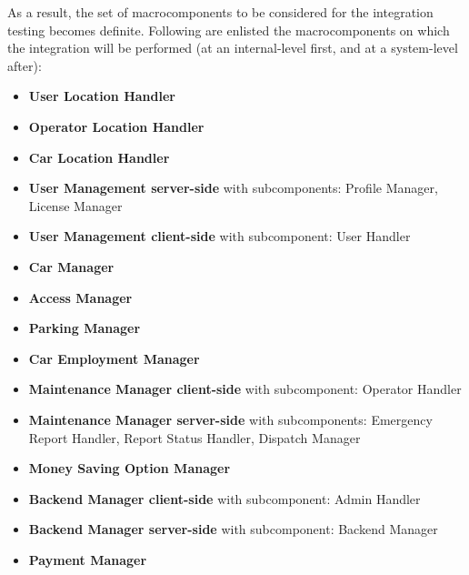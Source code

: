 	As a result, the set of macrocomponents to be considered for the integration testing becomes definite. Following are enlisted the macrocomponents on which the integration will be performed (at an internal-level first, and at a system-level after):
	\begin{itemize}
		\item \textbf{User Location Handler}
		\item \textbf{Operator Location Handler}
		\item \textbf{Car Location Handler}
		\item \textbf{User Management server-side} with subcomponents: Profile Manager, License Manager
		\item \textbf{User Management client-side} with subcomponent: User Handler
		\item \textbf{Car Manager}
		\item \textbf{Access Manager}
		\item \textbf{Parking Manager}
		\item \textbf{Car Employment Manager}
		\item \textbf{Maintenance Manager client-side} with subcomponent: Operator Handler
		\item \textbf{Maintenance Manager server-side} with subcomponents: Emergency Report Handler, Report Status Handler, Dispatch Manager
		\item \textbf{Money Saving Option Manager}
		\item \textbf{Backend Manager client-side} with subcomponent: Admin Handler
		\item \textbf{Backend Manager server-side} with subcomponent: Backend Manager
		\item \textbf{Payment Manager}
	\end{itemize}
	

